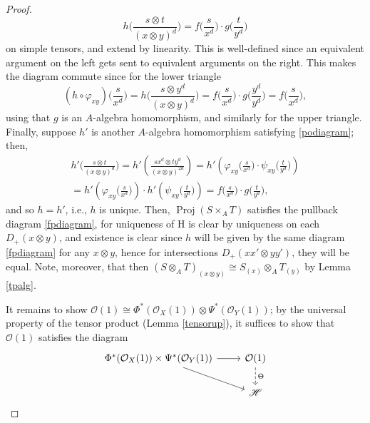 \documentclass[10pt]{article}
\theoremstyle{definition}
\theoremstyle{remark}
\numberwithin{equation}{section}
\numberwithin{figure}{subsubsection}
\DeclareMathOperator{\Proj}{Proj}
\newcommand{\HH}{\mathscr{H}}
\newcommand{\OO}{\mathcal{O}}
\begin{document}
\begin{proof}
\begin{equation}
    h\bigg( \frac{s \otimes t}{(x \otimes y)^d} \bigg) = f\bigg( \frac{s}{x^d} \bigg) \cdot g\bigg( \frac{t}{y^d} \bigg)
  \end{equation}
  on simple tensors, and extend by linearity. This is well-defined since an equivalent argument on the left gets sent to equivalent arguments on the right. This makes the diagram commute since for the lower triangle
  \begin{equation*}
    (h\circ\varphi_{xy})\bigg( \frac{s}{x^d} \bigg) = h\bigg( \frac{s \otimes y^d}{(x \otimes y)^d} \bigg) = f\bigg( \frac{s}{x^d} \bigg) \cdot g\bigg( \frac{y^d}{y^d} \bigg) = f\bigg( \frac{s}{x^d} \bigg),
  \end{equation*}
  using that $g$ is an $A$-algebra homomorphism, and similarly for the upper triangle. Finally, suppose $h'$ is another $A$-algebra homomorphism satisfying \eqref{podiagram}; then,
  \begin{multline*}
    h'\bigg( \frac{s \otimes t}{(x \otimes y)^d} \bigg) = h'\left( \frac{sx^d \otimes ty^d}{(x \otimes y)^{2d}} \right) = h'\left( \varphi_{xy}\bigg( \frac{s}{x^d} \bigg) \cdot \psi_{xy}\bigg( \frac{t}{y^d} \bigg) \right)\\
    = h'\left( \varphi_{xy}\bigg( \frac{s}{x^d} \bigg) \right) \cdot h'\left( \psi_{xy}\bigg( \frac{t}{y^d} \bigg) \right) = f\bigg( \frac{s}{x^d} \bigg) \cdot g\bigg( \frac{t}{y^d} \bigg),
  \end{multline*}
  and so $h = h'$, i.e., $h$ is unique. Then, $\Proj(S \times_A T)$ satisfies the pullback diagram \eqref{fpdiagram}, for uniqueness of $\mathrm{H}$ is clear by uniqueness on each $D_+(x \otimes y)$, and existence is clear since $h$ will be given by the same diagram \eqref{fpdiagram} for any $x \otimes y$, hence for intersections $D_+(xx' \otimes yy')$, they will be equal. Note, moreover, that then $(S \otimes_A T)_{(x \otimes y)} \cong S_{(x)} \otimes_A T_{(y)}$ by Lemma \ref{tpalg}.
  \par It remains to show $\OO(1) \cong \Phi^*(\OO_X(1)) \otimes \Psi^*(\OO_Y(1))$; by the universal property of the tensor product (Lemma \ref{tensorup}), it suffices to show that $\OO(1)$ satisfies the diagram
  \begin{equation}\label{p1p2tpdiagram}
    \begin{tikzcd}
      \Phi^*(\OO_X(1)) \times \Psi^*(\OO_Y(1)) \rar\arrow{dr} & \OO(1)\dar[dashed]{\Theta}\\
      & \HH
    \end{tikzcd}
  \end{equation}

\end{proof}
\end{document}
